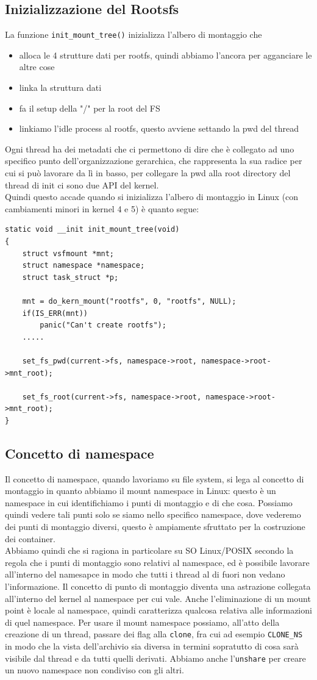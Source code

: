 \documentclass[12pt, oneside]{extbook}
\begin{document}
\subsection{Inizializzazione del Rootsfs}
La funzione \texttt{init\_mount\_tree()} inizializza l'albero di montaggio che 
\begin{itemize}
\item alloca le 4 strutture dati per rootfs, quindi abbiamo l'ancora per agganciare le altre cose
\item linka la struttura dati
\item fa il setup della "/" per la root del FS
\item linkiamo l'idle process al rootfs, questo avviene settando la pwd del thread
\end{itemize}
Ogni thread ha dei metadati che ci permettono di dire che è collegato ad uno specifico punto dell'organizzazione gerarchica, che rappresenta la sua radice per cui si può lavorare da lì in basso, per collegare la pwd alla root directory del thread di init ci sono due API del kernel.\\Quindi questo accade quando si inizializza l'albero di montaggio in Linux (con cambiamenti minori in kernel 4 e 5) è quanto segue:
\begin{lstlisting}
static void __init init_mount_tree(void)
{
	struct vsfmount *mnt;
	struct namespace *namespace;
	struct task_struct *p;
	
	mnt = do_kern_mount("rootfs", 0, "rootfs", NULL);
	if(IS_ERR(mnt))
		panic("Can't create rootfs");
	.....
	
	set_fs_pwd(current->fs, namespace->root, namespace->root->mnt_root);
	
	set_fs_root(current->fs, namespace->root, namespace->root->mnt_root);
}
\end{lstlisting}
\subsection{Concetto di namespace}
Il concetto di namespace, quando lavoriamo su file system, si lega al concetto di montaggio in quanto abbiamo il mount namespace in Linux: questo è un namespace in cui identifichiamo i punti di montaggio e di che cosa. Possiamo quindi vedere tali punti solo se siamo nello specifico namespace, dove vederemo dei punti di montaggio diversi, questo è ampiamente sfruttato per la costruzione dei container.\\Abbiamo quindi che si ragiona in particolare su SO Linux/POSIX secondo la regola che i punti di montaggio sono relativi al namespace, ed è possibile lavorare all'interno del namesapce in modo che tutti i thread al di fuori non vedano l'informazione. Il concetto di punto di montaggio diventa una astrazione collegata all'interno del kernel al namespace per cui vale. Anche l'eliminazione di un mount point è locale al namespace, quindi caratterizza qualcosa relativa alle informazioni di quel namespace. Per usare il mount namespace possiamo, all'atto della creazione di un thread, passare dei flag alla \texttt{clone}, fra cui ad esempio \texttt{CLONE\_NS} in modo che la vista dell'archivio sia diversa in termini sopratutto di cosa sarà visibile dal thread e da tutti quelli derivati. Abbiamo anche l'\texttt{unshare} per creare un nuovo namespace non condiviso con gli altri.
\end{document}

